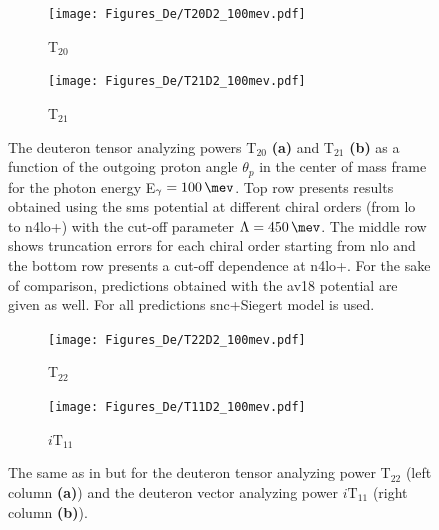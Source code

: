     \begin{figure}[htb]
        \centering
        \begin{subfigure}[b]{0.46\textwidth}
            \caption{T$_{20}$}
            \texttt{[image: Figures\_De/T20D2\_100mev.pdf]}
            \label{T20_100_vert}
        \end{subfigure}
        \begin{subfigure}[b]{0.46\textwidth}
            \caption{T$_{21}$}
            \texttt{[image: Figures\_De/T21D2\_100mev.pdf]}
            \label{T21_100_vert}
        \end{subfigure}
        \caption{The deuteron tensor analyzing powers T$_{20}$  {\bf (a)}
        and T$_{21}$ {\bf (b)}
        as a function of the outgoing proton angle $\theta_p$ in the center of mass frame 
        for the photon energy E$_\gamma=\SI{100}{\mev}$.
        Top row presents results obtained using the \gls{sms} potential
        at different chiral orders (from \gls{lo} to \gls{n4lo+}) with the cut-off parameter $\Lambda=\SI{450}{\mev}$.
        The middle row shows truncation errors for each 
        chiral order starting from \gls{nlo} and the
        bottom row presents a cut-off dependence at \gls{n4lo+}.
        For the sake of comparison, predictions obtained with the \gls{av18} potential are given as well.
        For all predictions \gls{snc}+Siegert model is used.}
        \label{T20_T21_100}
    \end{figure}

    \begin{figure}[htb]
        \centering
        \begin{subfigure}[b]{0.46\textwidth}
            \caption{T$_{22}$}
            \texttt{[image: Figures\_De/T22D2\_100mev.pdf]}
            \label{T22_100_vert}
        \end{subfigure}
        \begin{subfigure}[b]{0.46\textwidth}
            \caption{$i\text{T}_{11}$}
            \texttt{[image: Figures\_De/T11D2\_100mev.pdf]}
            \label{T11_100_vert}
        \end{subfigure}
        \caption{The same as in  but for the deuteron tensor analyzing power
        T$_{22}$ (left column {\bf (a)}) and
        the deuteron vector analyzing power $i\text{T}_{11}$
        (right column {\bf (b)}).}
        \label{T22_T11_100}
    \end{figure}

